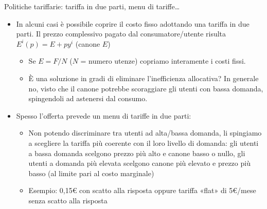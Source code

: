 \documentclass[aspectratio=64,12pt]{beamer}
\begin{document}
\begin{frame}{Politiche tariffarie: tariffa in due parti, menu di tariffe\ldots{}}
\begin{itemize}
\item In alcuni casi è possibile coprire il costo fisso adottando una
\alert{tariffa in due parti}. Il prezzo complessivo pagato dal consumatore/utente
risulta $E^i(p)=E+py^i$ (canone $E$)
\begin{itemize}
\item Se $E=F/N$ ($N$ = numero utenze) copriamo interamente i costi fissi.
\item È una soluzione in gradi di eliminare l'inefficienza allocativa? In
generale no, visto che il canone potrebbe scoraggiare gli utenti con bassa
domanda, spingendoli ad astenersi dal consumo.
\end{itemize}
\item Spesso l'offerta prevede un \alert{menu di tariffe in due parti}:
\begin{itemize}
\item Non potendo discriminare tra utenti ad alta/bassa domanda, li spingiamo a
scegliere la tariffa più coerente con il loro livello di domanda: gli
utenti a bassa domanda scelgono prezzo più alto e canone basso o nullo,
gli utenti a domanda più elevata scelgono canone più elevato e prezzo più
basso (al limite pari al costo marginale)
\item Esempio: 0,15€ con scatto alla risposta oppure tariffa «flat» di 5€/mese
senza scatto alla risposta
\end{itemize}
\end{itemize}
\end{frame}
\end{document}
